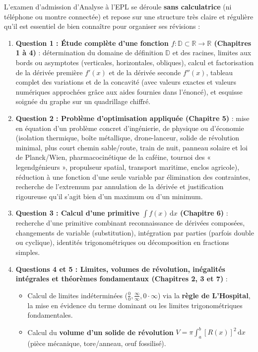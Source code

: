 \documentclass[11pt,a4paper,oneside]{book}
\newcommand{\R}{\mathbb{R}}
\newcommand{\D}{\mathbb{D}}
\newcommand{\dd}{\,\mathrm{d}}
\begin{document}
L'examen d'admission d'Analyse à l'EPL se déroule \textbf{sans calculatrice} (ni téléphone ou montre connectée) et repose sur une structure très claire et régulière qu'il est essentiel de bien connaître pour organiser ses révisions :
\begin{enumerate}
    \item \textbf{Question 1 : Étude complète d'une fonction $f : \D \subset \R \to \R$ (Chapitres 1 à 4)} : détermination du domaine de définition $\D$ et des racines, limites aux bords ou asymptotes (verticales, horizontales, obliques), calcul et factorisation de la dérivée première $f'(x)$ et de la dérivée seconde $f''(x)$, tableau complet des variations et de la concavité (avec valeurs exactes et valeurs numériques approchées grâce aux aides fournies dans l'énoncé), et esquisse soignée du graphe sur un quadrillage chiffré.
    \item \textbf{Question 2 : Problème d'optimisation appliquée (Chapitre 5)} : mise en équation d'un problème concret d'ingénierie, de physique ou d'économie (isolation thermique, boîte métallique, drone-lanceur, solide de révolution minimal, plus court chemin sable/route, train de nuit, panneau solaire et loi de Planck/Wien, pharmacocinétique de la caféine, tournoi des « legendgénieurs », propulseur spatial, transport maritime, enclos agricole), réduction à une fonction d'une seule variable par élimination des contraintes, recherche de l'extremum par annulation de la dérivée et justification rigoureuse qu'il s'agit bien d'un maximum ou d'un minimum.
    \item \textbf{Question 3 : Calcul d'une primitive $\int f(x)\dd x$ (Chapitre 6)} : recherche d'une primitive combinant reconnaissance de dérivées composées, changements de variable (substitution), intégration par parties (parfois double ou cyclique), identités trigonométriques ou décomposition en fractions simples.
    \item \textbf{Questions 4 et 5 : Limites, volumes de révolution, inégalités intégrales et théorèmes fondamentaux (Chapitres 2, 3 et 7)} :
    \begin{itemize}
        \item Calcul de limites indéterminées ($\frac{0}{0}, \frac{\infty}{\infty}, 0\cdot\infty$) via la \textbf{règle de L'Hospital}, la mise en évidence du terme dominant ou les limites trigonométriques fondamentales.
        \item Calcul du \textbf{volume d'un solide de révolution} $V = \pi \int_a^b [R(x)]^2\dd x$ (pièce mécanique, tore/anneau, œuf fossilisé).

\end{itemize}
\end{enumerate}
\end{document}
